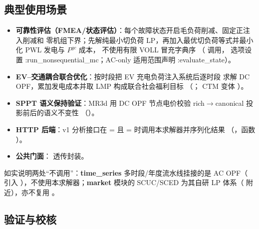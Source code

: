 \subsection{典型使用场景}

\begin{itemize}
  \item \textbf{可靠性评估（FMEA/状态评估）}：每个故障状态开启毛负荷削减、固定正注入削减和
        零机组下界；先解纯最小切负荷 LP，再加入最优切负荷等式并最小化 PWL 发电与 $P^{gc}$ 成本，
        不使用有限 VOLL 冒充字典序
        （ 调用，
        选项设置 :run\_nonsequential\_mc；AC-only 适用范围声明 :evaluate\_state）。
  \item \textbf{EV--交通耦合联合优化}：按时段把 EV 充电负荷注入系统后逐时段
        求解 DC OPF，累加发电成本并取 LMP 构成联合社会福利目标
        （；
        CTM 变体 ）。
  \item \textbf{SPPT 语义保持验证}：MR3d 用 DC OPF 节点电价校验
        rich$\to$canonical 投影前后的语义不变性
        （）。
  \item \textbf{HTTP 后端}：v1 分析接口在 =
        且 = 时调用本求解器并序列化结果
        （，函数
        ）。
  \item \textbf{公共门面}： 透传封装。
\end{itemize}
如实说明两处“不调用”：\textbf{time\_series} 多时段/年度流水线挂接的是
AC OPF（ 引入
），不使用本求解器；\textbf{market} 模块的
SCUC/SCED 为其自研 LP 体系（
附近），亦不复用 。

\subsection{验证与校核}

